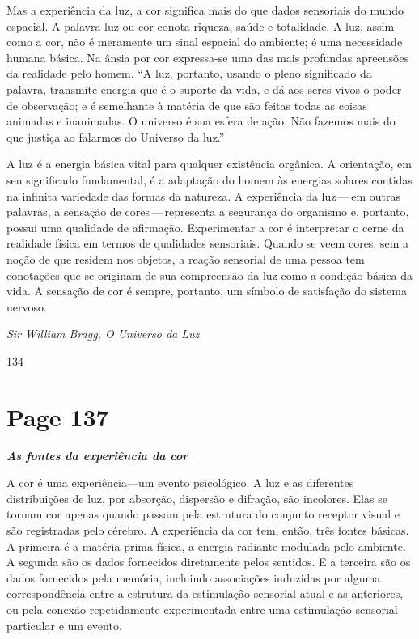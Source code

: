 \documentclass[a4paper]{article}
\begin{document}
\indent Mas a experiência da luz, a cor significa mais do que dados sensoriais do mundo espacial. A palavra luz ou cor conota riqueza, saúde e totalidade. A luz, assim como a cor, não é meramente um sinal espacial do ambiente; é uma necessidade humana básica. Na ânsia por cor expressa-se uma das mais profundas apreensões da realidade pelo homem. ``A luz, portanto, usando o pleno significado da palavra, transmite energia que é o suporte da vida, e dá aos seres vivos o poder de observação; e é semelhante à matéria de que são feitas todas as coisas animadas e inanimadas. O universo é sua esfera de ação. Não fazemos mais do que justiça ao falarmos do Universo da luz.'' \textbullet\par

\indent A luz é a energia básica vital para qualquer existência orgânica. A orientação, em seu significado fundamental, é a adaptação do homem às energias solares contidas na infinita variedade das formas da natureza. A experiência da luz\,---\,em outras palavras, a sensação de cores\,---\,representa a segurança do organismo e, portanto, possui uma qualidade de afirmação. Experimentar a cor é interpretar o cerne da realidade física em termos de qualidades sensoriais. Quando se veem cores, sem a noção de que residem nos objetos, a reação sensorial de uma pessoa tem conotações que se originam de sua compreensão da luz como a condição básica da vida. A sensação de cor é sempre, portanto, um símbolo de satisfação do sistema nervoso.\par

\bigskip
\textbullet \textit{Sir William Bragg, O Universo da Luz}\par
\bigskip

134\par

\newpage
\section*{Page 137}

\centering\textit{\textbf{As fontes da experiência da cor}}
\par\bigskip

\noindent A cor é uma experiência---um evento psicológico. A luz e as diferentes distribuições de luz, por absorção, dispersão e difração, são incolores. Elas se tornam cor apenas quando passam pela estrutura do conjunto receptor visual e são registradas pelo cérebro. A experiência da cor tem, então, três fontes básicas. A primeira é a matéria-prima física, a energia radiante modulada pelo ambiente. A segunda são os dados fornecidos diretamente pelos sentidos. E a terceira são os dados fornecidos pela memória, incluindo associações induzidas por alguma correspondência entre a estrutura da estimulação sensorial atual e as anteriores, ou pela conexão repetidamente experimentada entre uma estimulação sensorial particular e um evento.
\end{document}
